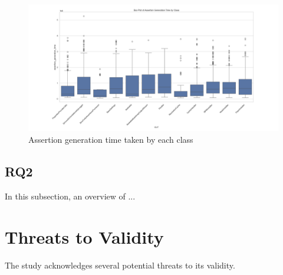 \begin{figure}[H]
\centering
\includegraphics[width=1\textwidth]{images/assertion_time_by_class.png}
\caption{Assertion generation time taken by each class}
\label{fig:assertion_time_class}
\end{figure}

\vspace{0.1 cm}
\subsection{RQ2}
\label{sec:results_rq2}
\vspace{0.1 cm}

In this subsection, an overview of ...

\section{Threats to Validity}
\label{sec:t2v}
\vspace{0.2 cm}

The study acknowledges several potential threats to its validity.


